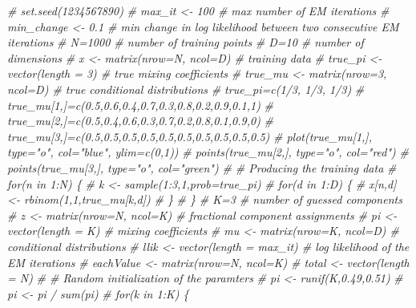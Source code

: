 \documentclass[]{article}
\newenvironment{Shaded}{\begin{snugshade}}{\end{snugshade}}
\newcommand{\CommentTok}[1]{\textcolor[rgb]{0.56,0.35,0.01}{\textit{#1}}}
\begin{document}
\begin{Shaded}
\begin{Highlighting}[]
\CommentTok{# set.seed(1234567890)}
\CommentTok{# max_it <- 100 # max number of EM iterations}
\CommentTok{# min_change <- 0.1 # min change in log likelihood between two consecutive EM iterations}
\CommentTok{# N=1000 # number of training points}
\CommentTok{# D=10 # number of dimensions}
\CommentTok{# x <- matrix(nrow=N, ncol=D) # training data}
\CommentTok{# true_pi <- vector(length = 3) # true mixing coefficients}
\CommentTok{# true_mu <- matrix(nrow=3, ncol=D) # true conditional distributions}
\CommentTok{# true_pi=c(1/3, 1/3, 1/3)}
\CommentTok{# true_mu[1,]=c(0.5,0.6,0.4,0.7,0.3,0.8,0.2,0.9,0.1,1)}
\CommentTok{# true_mu[2,]=c(0.5,0.4,0.6,0.3,0.7,0.2,0.8,0.1,0.9,0)}
\CommentTok{# true_mu[3,]=c(0.5,0.5,0.5,0.5,0.5,0.5,0.5,0.5,0.5,0.5)}
\CommentTok{# plot(true_mu[1,], type="o", col="blue", ylim=c(0,1))}
\CommentTok{# points(true_mu[2,], type="o", col="red")}
\CommentTok{# points(true_mu[3,], type="o", col="green")}
\CommentTok{# # Producing the training data}
\CommentTok{# for(n in 1:N) \{}
\CommentTok{# k <- sample(1:3,1,prob=true_pi)}
\CommentTok{# for(d in 1:D) \{}
\CommentTok{# x[n,d] <- rbinom(1,1,true_mu[k,d])}
\CommentTok{# \}}
\CommentTok{# \}}
\CommentTok{# K=3 # number of guessed components}
\CommentTok{# z <- matrix(nrow=N, ncol=K) # fractional component assignments}
\CommentTok{# pi <- vector(length = K) # mixing coefficients}
\CommentTok{# mu <- matrix(nrow=K, ncol=D) # conditional distributions}
\CommentTok{# llik <- vector(length = max_it) # log likelihood of the EM iterations}
\CommentTok{# eachValue <- matrix(nrow=N, ncol=K)}
\CommentTok{# total <- vector(length = N)}
\CommentTok{# # Random initialization of the paramters}
\CommentTok{# pi <- runif(K,0.49,0.51)}
\CommentTok{# pi <- pi / sum(pi)}
\CommentTok{# for(k in 1:K) \{}


\end{Highlighting}
\end{Shaded}
\end{document}
